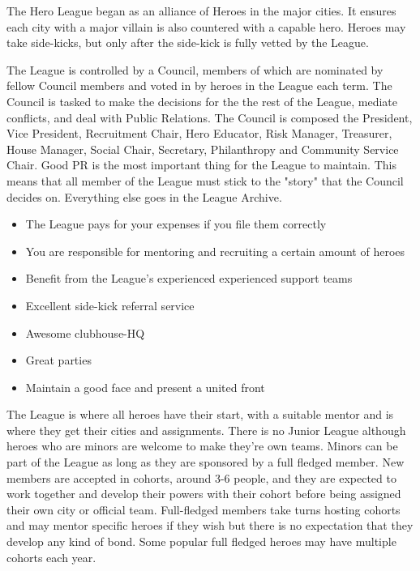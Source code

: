 \documentclass[blue]{LRSguildcamp1}
\begin{document}
\name{\bHeroLeague{}}


The Hero League began as an alliance of Heroes in the major cities. It ensures each city with a major villain is also countered with a capable hero. Heroes may take side-kicks, but only after the side-kick is fully vetted by the League. 

The League is controlled by a Council, members of which are nominated by fellow Council members and voted in by heroes in the League each term. The Council is tasked to make the decisions for the the rest of the League, mediate conflicts, and deal with Public Relations. The Council is composed the President, Vice President, Recruitment Chair, Hero Educator, Risk Manager, Treasurer, House Manager, Social Chair, Secretary, Philanthropy and Community Service Chair. Good PR is the most important thing for the League to maintain. This means that all member of the League must stick to the "story" that the Council decides on. Everything else goes in the League Archive.

\begin{itemize}
\item The League pays for your expenses if you file them correctly 
\item You are responsible for mentoring and recruiting a certain amount of heroes
\item Benefit from the League's experienced experienced support teams
\item Excellent side-kick referral service 
\item Awesome clubhouse-HQ
\item Great parties
\item Maintain a good face and present a united front
\end{itemize}

The League is where all heroes have their start, with a suitable mentor and is where they get their cities and assignments. There is no Junior League although heroes who are minors are welcome to make they're own teams. Minors can be part of the League as long as they are sponsored by a full fledged member. New members are accepted in cohorts, around 3-6 people, and they are expected to work together and develop their powers with their cohort before being assigned their own city or official team. Full-fledged members take turns hosting cohorts and may mentor specific heroes if they wish but there is no expectation that they develop any kind of bond. Some popular full fledged heroes may have multiple cohorts each year.  
\end{document}
